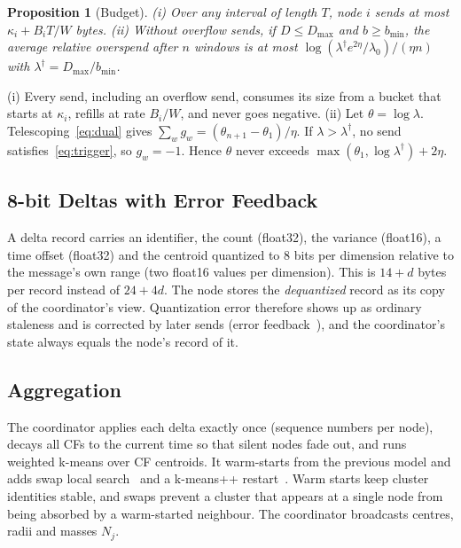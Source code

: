 \documentclass[journal]{IEEEtran}
\newtheorem{proposition}{Proposition}
\begin{document}
\begin{proposition}[Budget]\label{prop:budget}
(i) Over any interval of length $T$, node $i$ sends at most $\kappa_i+B_iT/W$ bytes. (ii) Without overflow sends, if $D\le D_{\max}$ and $b\ge b_{\min}$, the average relative overspend after $n$ windows is at most $\log(\lambda^\dagger e^{2\eta}/\lambda_0)/(\eta n)$ with $\lambda^\dagger=D_{\max}/b_{\min}$.
\end{proposition}
\begin{IEEEproof}
(i) Every send, including an overflow send, consumes its size from a bucket that starts at $\kappa_i$, refills at rate $B_i/W$, and never goes negative. (ii) Let $\theta=\log\lambda$. Telescoping~\eqref{eq:dual} gives $\sum_w g_w=(\theta_{n+1}-\theta_1)/\eta$. If $\lambda>\lambda^\dagger$, no send satisfies~\eqref{eq:trigger}, so $g_w=-1$. Hence $\theta$ never exceeds $\max(\theta_1,\log\lambda^\dagger)+2\eta$.
\end{IEEEproof}

\subsection{8-bit Deltas with Error Feedback}
A delta record carries an identifier, the count (float32), the variance (float16), a time offset (float32) and the centroid quantized to 8 bits per dimension relative to the message's own range (two float16 values per dimension). This is $14+d$ bytes per record instead of $24+4d$. The node stores the \emph{dequantized} record as its copy of the coordinator's view. Quantization error therefore shows up as ordinary staleness and is corrected by later sends (error feedback~\cite{karimireddy2019ef}), and the coordinator's state always equals the node's record of it.

\subsection{Aggregation}
The coordinator applies each delta exactly once (sequence numbers per node), decays all CFs to the current time so that silent nodes fade out, and runs weighted k-means over CF centroids. It warm-starts from the previous model and adds swap local search~\cite{kanungo2004local} and a k-means++ restart~\cite{arthur2007kmeanspp}. Warm starts keep cluster identities stable, and swaps prevent a cluster that appears at a single node from being absorbed by a warm-started neighbour. The coordinator broadcasts centres, radii and masses $N_j$.
\end{document}
